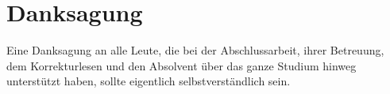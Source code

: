 \chapter*{Danksagung}



\setcounter{danksagung_seitenzahl}{\value{page}}

Eine Danksagung an alle Leute, die bei der Abschlussarbeit, ihrer Betreuung,
dem Korrekturlesen und den Absolvent über das ganze Studium hinweg
unterstützt haben, sollte eigentlich selbstverständlich sein.
